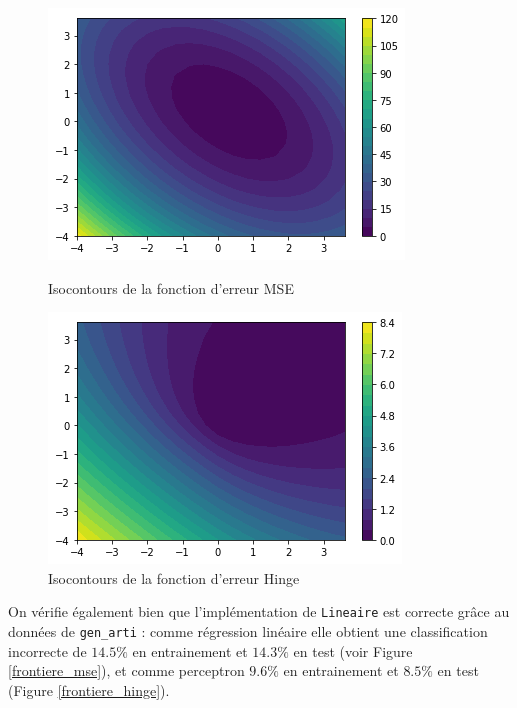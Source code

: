 \documentclass[a4paper]{article}
\begin{document}
\begin{figure}[ht!]
\begin{center}
\begin{minipage}{0.45\textwidth}
\includegraphics[scale=0.5]{isocontour_mse.png}
\caption{Isocontours de la fonction d'erreur MSE}
\label{isocontour_mse}
\end{minipage}\hfill
\begin{minipage}{0.45\textwidth}
\includegraphics[scale=0.5]{isocontour_hinge.png}
\caption{Isocontours de la fonction d'erreur Hinge}
\label{isocontour_hinge}
\end{minipage}
\end{center}
\end{figure}

On vérifie également bien que l'implémentation de \verb!Lineaire! est correcte grâce au données de \verb!gen_arti! : comme régression linéaire elle obtient une classification incorrecte de $14.5\%$ en entrainement et $14.3\%$ en test (voir Figure \ref{frontiere_mse}), et comme perceptron $9.6\%$ en entrainement et $8.5\%$ en test (Figure \ref{frontiere_hinge}).
\end{document}
